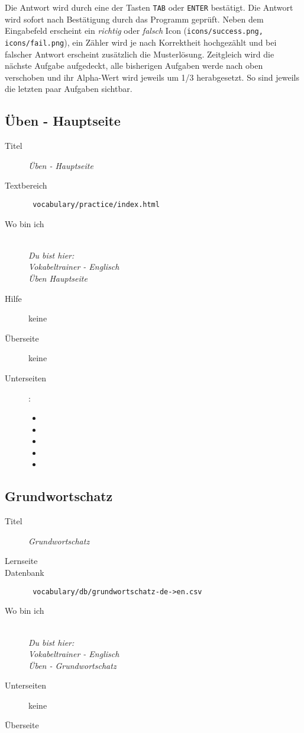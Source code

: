 Die Antwort wird durch eine der Tasten \texttt{TAB} oder \texttt{ENTER} bestätigt. 
Die Antwort wird sofort nach Bestätigung durch das Programm geprüft. 
Neben dem Eingabefeld erscheint ein \emph{richtig} oder \emph{falsch} Icon (\texttt{icons/success.png, icons/fail.png}), ein Zähler wird je nach Korrektheit hochgezählt und bei falscher Antwort erscheint zusätzlich die Musterlösung.
Zeitgleich wird die nächste Aufgabe aufgedeckt, alle bisherigen Aufgaben werde nach oben verschoben und ihr Alpha-Wert wird jeweils um 1/3 herabgesetzt.
So sind jeweils die letzten paar Aufgaben sichtbar.

\subsection{ Üben - Hauptseite }
\label{has:voc-practice-page0}
\begin{description}
	\item[Titel] \emph{ Üben - Hauptseite }
	\item[Textbereich] \texttt{ vocabulary/practice/index.html }
	\item[Wo bin ich] \emph{\\Du bist hier:\\Vokabeltrainer - Englisch\\Üben Hauptseite}
	\item[Hilfe] keine
	\item[Überseite] keine
	\item[Unterseiten] :
	\begin{itemize}
		\item {}
		\item {}
		\item {}
		\item {}
		\item {}
	\end{itemize}
\end{description}

\subsection{ Grundwortschatz }
\label{has:voc-practice-page1}
\begin{description}
	\item[Titel] \emph{ Grundwortschatz }
	\item[Lernseite] 
	\item[Datenbank] \texttt{ vocabulary/db/grundwortschatz-de->en.csv }
	\item[Wo bin ich] \emph{\\Du bist hier:\\Vokabeltrainer - Englisch\\Üben - Grundwortschatz}
	\item[Unterseiten] keine
	\item[Überseite] 
\end{description}

